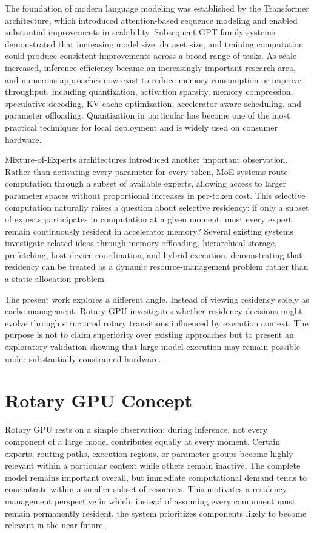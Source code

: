\documentclass[11pt]{article}
\begin{document}
The foundation of modern language modeling was established by the Transformer architecture, which introduced attention-based sequence modeling and enabled substantial improvements in scalability. Subsequent GPT-family systems demonstrated that increasing model size, dataset size, and training computation could produce consistent improvements across a broad range of tasks. As scale increased, inference efficiency became an increasingly important research area, and numerous approaches now exist to reduce memory consumption or improve throughput, including quantization, activation sparsity, memory compression, speculative decoding, KV-cache optimization, accelerator-aware scheduling, and parameter offloading. Quantization in particular has become one of the most practical techniques for local deployment and is widely used on consumer hardware.

Mixture-of-Experts architectures introduced another important observation. Rather than activating every parameter for every token, MoE systems route computation through a subset of available experts, allowing access to larger parameter spaces without proportional increases in per-token cost. This selective computation naturally raises a question about selective residency: if only a subset of experts participates in computation at a given moment, must every expert remain continuously resident in accelerator memory? Several existing systems investigate related ideas through memory offloading, hierarchical storage, prefetching, host-device coordination, and hybrid execution, demonstrating that residency can be treated as a dynamic resource-management problem rather than a static allocation problem.

The present work explores a different angle. Instead of viewing residency solely as cache management, Rotary GPU investigates whether residency decisions might evolve through structured rotary transitions influenced by execution context. The purpose is not to claim superiority over existing approaches but to present an exploratory validation showing that large-model execution may remain possible under substantially constrained hardware.

\section{Rotary GPU Concept}

Rotary GPU rests on a simple observation: during inference, not every component of a large model contributes equally at every moment. Certain experts, routing paths, execution regions, or parameter groups become highly relevant within a particular context while others remain inactive. The complete model remains important overall, but immediate computational demand tends to concentrate within a smaller subset of resources. This motivates a residency-management perspective in which, instead of assuming every component must remain permanently resident, the system prioritizes components likely to become relevant in the near future.
\end{document}
